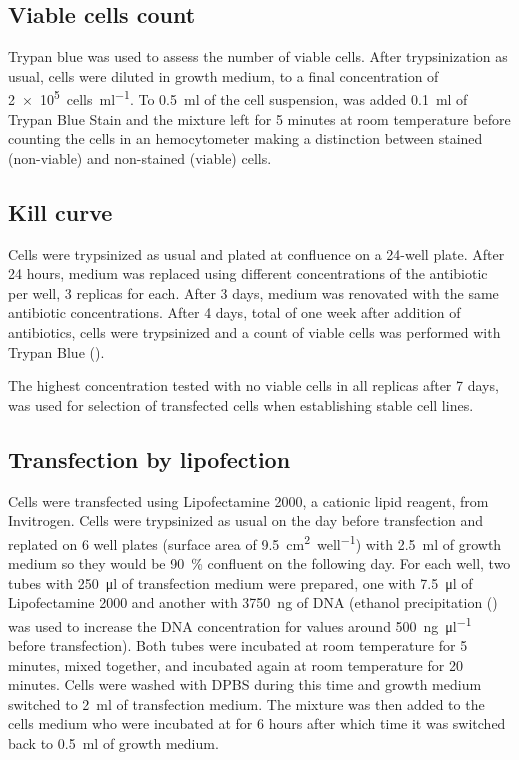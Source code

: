  \subsection{Viable cells count}
    \label{sec:methods:trypan-blue}
    Trypan blue was used to assess the number of viable cells. After trypsinization
    as usual, cells were diluted in growth medium, to a final concentration of \SI{2e5}{cells\per\ml}.
    To \SI{0.5}{\ml} of the cell suspension, was added \SI{0.1}{\ml} of  Trypan
    Blue Stain and the mixture left for 5 minutes at room temperature before counting
    the cells in an hemocytometer making a distinction between stained (non-viable)
    and non-stained (viable) cells.

  \subsection{Kill curve}
    \label{sec:methods:kill-curve}
    Cells were trypsinized as usual and plated at  confluence on
    a 24-well plate. After 24 hours, medium was replaced using different
    concentrations of the antibiotic per well, 3 replicas for each.
    After 3 days, medium was
    renovated with the same antibiotic concentrations. After 4 days, total of
    one week after addition of antibiotics, cells were trypsinized and a count
    of viable cells was performed with Trypan Blue ().

    The highest concentration tested with no viable cells in all replicas after
    7 days, was used for selection of transfected cells when establishing
    stable cell lines.

  \subsection{Transfection by lipofection}
    \label{methods:lipofection}
    Cells were transfected using Lipofectamine 2000, a cationic lipid reagent, from
    Invitrogen. Cells were trypsinized as usual on the day before transfection and
    replated on 6 well plates (surface area of \SI{9.5}{\square\cm\per well}) with \SI{2.5}{\ml} of growth
    medium so they would be \SI{90}{\percent} confluent on the following day. For each well,
    two tubes with \SI{250}{\ul} of transfection medium were prepared, one with \SI{7.5}{\ul}
    of Lipofectamine 2000 and another with \SI{3750}{\ng} of DNA (ethanol precipitation
    () was used to increase the DNA concentration for values around \SI{500}{\ng\per\ul}
    before transfection). Both tubes were incubated at room temperature for 5 minutes,
    mixed together, and incubated again at room temperature for 20 minutes. Cells
    were washed with DPBS during this time and growth medium switched to \SI{2}{\ml}
    of transfection medium. The mixture was then added to the cells medium who
    were incubated at  for 6 hours after which time it was switched back to
    \SI{0.5}{\ml} of growth medium.


